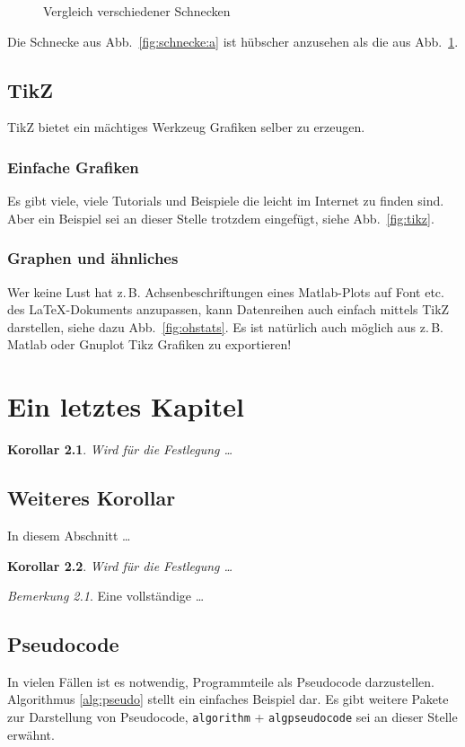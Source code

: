 \documentclass[12pt,DIV=15,BCOR=15mm,twoside,headsepline,abstract=true,listof=totoc,bibliography=totoc]{scrreprt}
\newtheorem{kor}{Korollar}
\theoremstyle{remark}	%
\newtheorem{bem}{Bemerkung}
\begin{document}
\begin{figure}[h!t]
\begin{subfigure}{0.4\textwidth}
\label{fig:schnecke:b}
\end{subfigure}
\caption{Vergleich verschiedener Schnecken}
\label{fig:seam}
\end{figure}

Die Schnecke aus Abb.~\ref{fig:schnecke:a} ist hübscher anzusehen als die aus Abb.~\ref{fig:schnecke:b}.

\section{TikZ}
TikZ bietet ein mächtiges Werkzeug Grafiken selber zu erzeugen.
\subsection{Einfache Grafiken}
Es gibt viele, viele Tutorials und Beispiele die leicht im Internet zu finden sind. Aber ein Beispiel sei an dieser Stelle trotzdem eingefügt, siehe Abb.~\ref{fig:tikz}.

\subsection{Graphen und ähnliches}
Wer keine Lust hat z.\,B. Achsenbeschriftungen eines Matlab-Plots auf Font etc. des \LaTeX -Dokuments anzupassen, kann Datenreihen auch einfach mittels TikZ darstellen, siehe dazu Abb.~\ref{fig:ohstats}. Es ist natürlich auch möglich aus z.\,B. Matlab oder Gnuplot Tikz Grafiken zu exportieren!


\chapter{Ein letztes Kapitel}
\begin{kor}\label{kor2}
Wird f\"{u}r die Festlegung  \dots
\end{kor}
\section{Weiteres Korollar}
In diesem Abschnitt  \dots
\begin{kor}\label{kor3}
Wird f\"{u}r die Festlegung  \dots
\end{kor}

\begin{bem}\label{bem3}
Eine vollst\"{a}ndige  \dots
\end{bem}

\section{Pseudocode}
In vielen Fällen ist es notwendig, Programmteile als Pseudocode darzustellen. Algorithmus \ref{alg:pseudo} stellt ein einfaches Beispiel dar. Es gibt weitere Pakete zur Darstellung von Pseudocode, \texttt{algorithm} + \texttt{algpseudocode} sei an dieser Stelle erwähnt.
\end{document}
